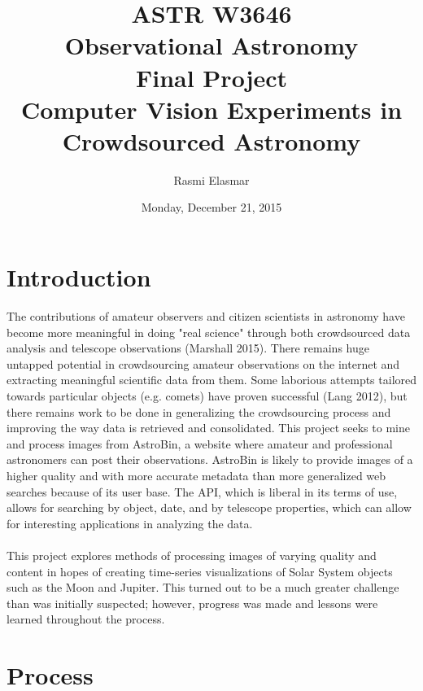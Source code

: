 \documentclass[]{article}
\begin{document}
\title{ASTR W3646 \\ Observational Astronomy \\ Final Project \\ Computer Vision Experiments in Crowdsourced Astronomy}
\author{Rasmi Elasmar}
\date{Monday, December 21, 2015}
\maketitle
\section*{Introduction}
The contributions of amateur observers and citizen scientists in astronomy have become more meaningful in doing "real science" through both crowdsourced data analysis and telescope observations (Marshall 2015). There remains huge untapped potential in crowdsourcing amateur observations on the internet and extracting meaningful scientific data from them. Some laborious attempts tailored towards particular objects (e.g. comets) have proven successful (Lang 2012), but there remains work to be done in generalizing the crowdsourcing process and improving the way data is retrieved and consolidated. This project seeks to mine and process images from AstroBin, a website where amateur and professional astronomers can post their observations. AstroBin is likely to provide images of a higher quality and with more accurate metadata than more generalized web searches because of its user base. The API, which is liberal in its terms of use, allows for searching by object, date, and by telescope properties, which can allow for interesting applications in analyzing the data. 
\\\\
This project explores methods of processing images of varying quality and content in hopes of creating time-series visualizations of Solar System objects such as the Moon and Jupiter. This turned out to be a much greater challenge than was initially suspected; however, progress was made and lessons were learned throughout the process.
\section*{Process}
\end{document}
